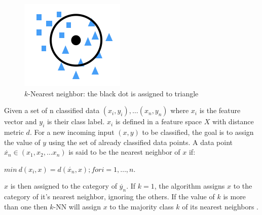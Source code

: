 \begin{figure}[htb!]
    \centering
    \includegraphics[scale=1]{files/knn.png}
    \caption{$k$-Nearest neighbor: the black dot is assigned to triangle}
    \label{k-Nearest neighbor}
    \end{figure}
    \FloatBarrier


Given a set of n classified data $(x_i, y_i),\dots(x_n, y_n)$ where $x_i$ is the feature vector and $y_i$ is their class label. $x_i$ is defined in a feature space $X$ with distance metric $d$. For a new incoming input $(x, y)$ to be classified, the goal is to assign the value of $y$ using the set of already classified data points. A data point $\acute{x_n} \in (x_1, x_2, \dots x_n)$ is said to be the nearest neighbor of $x$ if:
\begin{center}
$min\ d(x_i,x) = d(\acute{x_n},x); for i = 1,\dots,n.$ 
\end{center}
$x$ is then assigned to the category of $\acute{y_n}$. If $k = 1$, the algorithm assigns $x$ to the category of it's nearest neighbor, ignoring the others. If the value of $k$ is more than one then $k$-NN will assign $x$ to the majority class $k$ of its nearest neighbors \cite{cover1967}.

